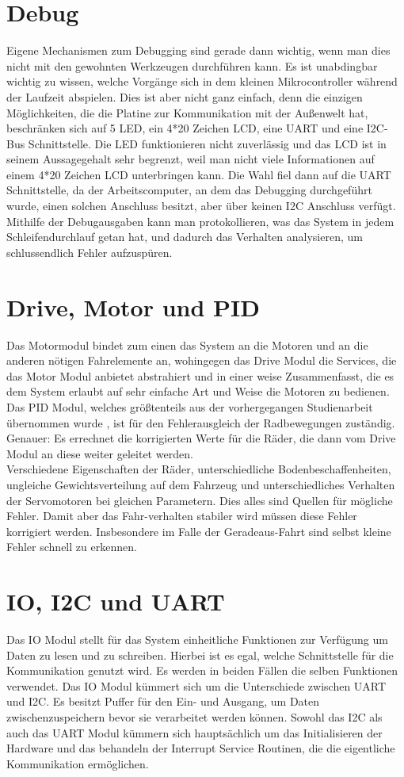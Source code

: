 \section{Debug}
Eigene Mechanismen zum Debugging sind gerade dann wichtig, wenn man dies nicht mit den
gewohnten Werkzeugen durchführen kann.
Es ist unabdingbar wichtig zu wissen, welche Vorgänge sich in dem kleinen Mikrocontroller
während der Laufzeit abspielen.
Dies ist aber nicht ganz einfach, denn die einzigen Möglichkeiten, die die Platine zur
Kommunikation mit der Außenwelt hat, beschränken sich auf
5 LED, ein 4*20 Zeichen LCD, eine UART und eine I2C-Bus 
Schnittstelle.
Die LED funktionieren nicht zuverlässig und das LCD ist in seinem Aussagegehalt sehr
begrenzt, weil man nicht viele Informationen auf einem 4*20 Zeichen LCD unterbringen kann. 
Die Wahl fiel dann auf
die UART Schnittstelle, da der Arbeitscomputer, an dem das Debugging durchgeführt wurde,
einen solchen Anschluss besitzt, aber über keinen I2C Anschluss verfügt.
Mithilfe der Debugausgaben kann man protokollieren, was das System in jedem
Schleifendurchlauf getan hat, und dadurch das Verhalten analysieren, um schlussendlich
Fehler aufzuspüren. 
\section{Drive, Motor und PID}
Das Motormodul bindet zum einen das System an die Motoren und an die anderen nötigen
Fahrelemente an, wohingegen das Drive Modul die Services, die das Motor Modul anbietet
abstrahiert und in einer weise Zusammenfasst, die es dem System erlaubt auf sehr einfache
Art und Weise die Motoren zu bedienen.
Das PID Modul, welches größtenteils aus der vorhergegangen Studienarbeit übernommen wurde
\cite{STUD_TIMO}, ist für den Fehlerausgleich der Radbewegungen zuständig. Genauer: Es
errechnet die korrigierten Werte für die Räder, die dann vom Drive Modul an diese 
weiter geleitet werden.\\
Verschiedene Eigenschaften der Räder, unterschiedliche Bodenbeschaffenheiten,
ungleiche Gewichtsverteilung auf dem Fahrzeug und unterschiedliches Verhalten der
Servomotoren bei gleichen Parametern. Dies alles sind Quellen für mögliche Fehler.
Damit aber das Fahr-verhalten stabiler wird müssen diese Fehler korrigiert werden.
Insbesondere im Falle der Geradeaus-Fahrt sind selbst kleine Fehler schnell zu erkennen.
\section{IO, I2C und UART}
Das IO Modul stellt für das System einheitliche Funktionen zur Verfügung um Daten zu lesen
und zu schreiben. Hierbei ist es egal, welche Schnittstelle für die Kommunikation genutzt wird.
Es werden in beiden Fällen die selben Funktionen verwendet.
Das IO Modul kümmert sich um die Unterschiede zwischen UART und I2C. Es besitzt Puffer für den
Ein- und Ausgang, um Daten zwischenzuspeichern bevor sie verarbeitet werden können.
Sowohl das I2C als auch das UART Modul kümmern sich hauptsächlich um das Initialisieren der
Hardware und das behandeln der Interrupt Service Routinen, die die eigentliche Kommunikation
ermöglichen.
